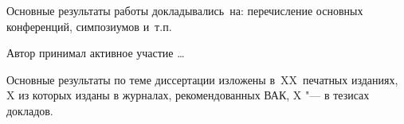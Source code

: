 


{\probation}
Основные результаты работы докладывались~на:
перечисление основных конференций, симпозиумов и~т.\:п.

{\contribution} Автор принимал активное участие \ldots

{%
    {\publications} Основные результаты по теме диссертации изложены
    в~XX~печатных изданиях,
    X из которых изданы в журналах, рекомендованных ВАК,
    X "--- в тезисах докладов.
}%
